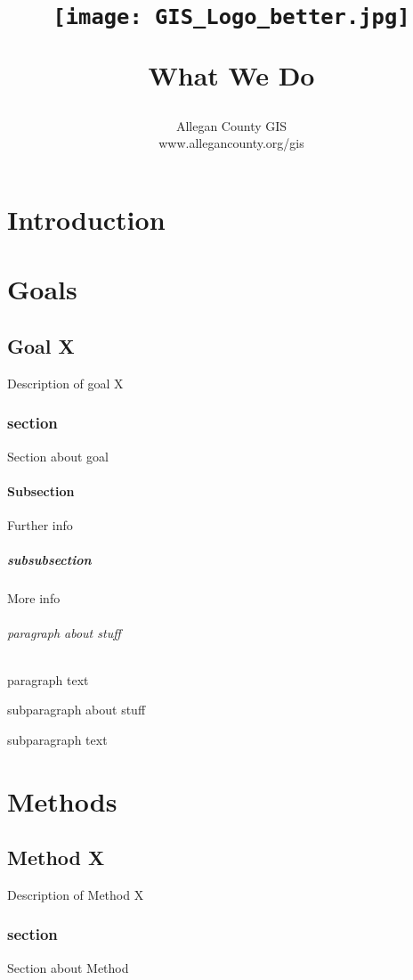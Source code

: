 \documentclass{book}
\title{\HRule \\[.4cm] 
\begin{figure}[H] %
\begin{center}	 
	\texttt{[image: GIS\_Logo\_better.jpg]}
	\end{center}
	\end{figure}
	\Huge \bfseries What We Do
\HRule \\[.4cm]
}
\author{\Large Allegan County GIS \\\Large www.allegancounty.org/gis}
\begin{document}
\frontmatter

\maketitle
\tableofcontents
\mainmatter
\pagebreak
\part*{Introduction}
\part{Goals}
\chapter{Goal X}
Description of goal X
\section{section}
Section about goal
\subsection{Subsection}
Further info
\subsubsection{subsubsection}
More info
\paragraph{paragraph about stuff}
paragraph text
\subparagraph{subparagraph about stuff}
subparagraph text

\part{Methods}
\chapter{Method X}
Description of Method X
\section{section}
Section about Method
\end{document}
